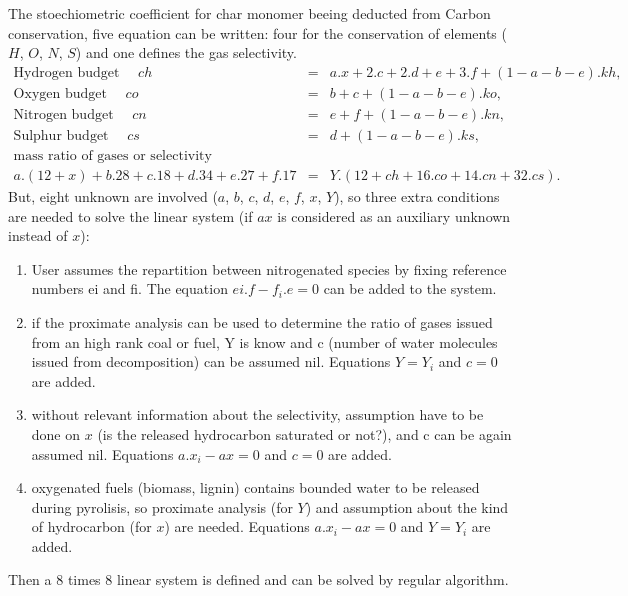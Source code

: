 The stoechiometric coefficient for char monomer beeing deducted from Carbon
conservation, five equation can be written: four for the conservation of
elements ($H$, $O$, $N$, $S$) and one defines the gas selectivity.
\begin{eqnarray*}
  \text{Hydrogen budget  } \quad ch &=& a.x + 2.c + 2.d + e + 3.f +(1-a-b-e).kh, \\
  \text{Oxygen budget    } \quad co &=& b + c + (1-a-b-e) . ko, \\
  \text{Nitrogen budget  } \quad cn &=& e + f + (1-a-b-e).kn, \\
  \text{Sulphur budget   } \quad cs &=& d + (1-a-b-e) .ks, \\
  \text{mass ratio of gases or selectivity} \\
  a.(12+x) + b.28 +c.18+d.34+e.27+f.17 &=& Y .(12+ch+16.co+14.cn+32.cs).
\end{eqnarray*}
But, eight unknown are involved ($a$, $b$, $c$, $d$, $e$, $f$, $x$, $Y$), so three extra
conditions are needed to solve the linear system (if $ax$ is considered as an
auxiliary unknown instead of $x$):
\begin{enumerate}

\item User assumes the repartition between nitrogenated species by fixing
  reference numbers ei and fi. The equation $ei.f-f_i.e=0$ can be added to the
  system.
\item if the proximate analysis can be used to determine the ratio of gases
  issued from an high rank coal or fuel, Y is know and c (number of water
  molecules issued from decomposition) can be assumed nil. Equations $Y=Y_i$ and
  $c=0$ are added.
\item without relevant information about the selectivity, assumption have to be
  done on $x$ (is the released hydrocarbon saturated or not?), and c can be again
  assumed nil. Equations $a.x_i-ax = 0$ and $c=0$ are added.
\item oxygenated fuels (biomass, lignin) contains bounded water to be released
  during pyrolisis, so proximate analysis (for $Y$) and assumption about the kind
  of hydrocarbon (for $x$) are needed. Equations $a.x_i-ax = 0$ and $Y=Y_i$ are
  added.

\end{enumerate}
Then a 8 times 8 linear system is defined and can be solved by regular algorithm.
 
